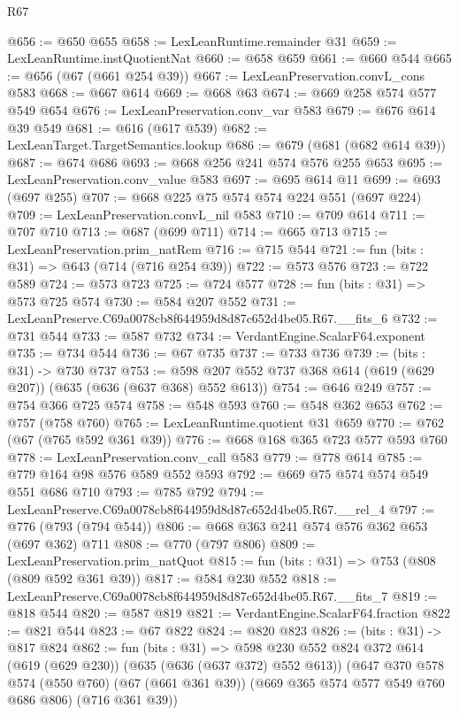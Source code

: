 \begin{lexlean}{R67}
\begin{coremodule}
@656 := @650 @655
@658 := LexLeanRuntime.remainder @31
@659 := LexLeanRuntime.instQuotientNat
@660 := @658 @659
@661 := @660 @544
@665 := @656 (@67 (@661 @254 @39))
@667 := LexLeanPreservation.convL_cons @583
@668 := @667 @614
@669 := @668 @63
@674 := @669 @258 @574 @577 @549 @654
@676 := LexLeanPreservation.conv_var @583
@679 := @676 @614 @39 @549
@681 := @616 (@617 @539)
@682 := LexLeanTarget.TargetSemantics.lookup
@686 := @679 (@681 (@682 @614 @39))
@687 := @674 @686
@693 := @668 @256 @241 @574 @576 @255 @653
@695 := LexLeanPreservation.conv_value @583
@697 := @695 @614 @11
@699 := @693 (@697 @255)
@707 := @668 @225 @75 @574 @574 @224 @551 (@697 @224)
@709 := LexLeanPreservation.convL_nil @583
@710 := @709 @614
@711 := @707 @710
@713 := @687 (@699 @711)
@714 := @665 @713
@715 := LexLeanPreservation.prim_natRem
@716 := @715 @544
@721 := fun (bits : @31) => @643 (@714 (@716 @254 @39))
@722 := @573 @576
@723 := @722 @589
@724 := @573 @723
@725 := @724 @577
@728 := fun (bits : @31) => @573 @725 @574
@730 := @584 @207 @552
@731 := LexLeanPreserve.C69a0078cb8f644959d8d87c652d4be05.R67.__fits_6
@732 := @731 @544
@733 := @587 @732
@734 := VerdantEngine.ScalarF64.exponent
@735 := @734 @544
@736 := @67 @735
@737 := @733 @736
@739 := (bits : @31) -> @730 @737
@753 := @598 @207 @552 @737 @368 @614 (@619 (@629 @207)) (@635 (@636 (@637 @368) @552 @613))
@754 := @646 @249
@757 := @754 @366 @725 @574
@758 := @548 @593
@760 := @548 @362 @653
@762 := @757 (@758 @760)
@765 := LexLeanRuntime.quotient @31 @659
@770 := @762 (@67 (@765 @592 @361 @39))
@776 := @668 @168 @365 @723 @577 @593 @760
@778 := LexLeanPreservation.conv_call @583
@779 := @778 @614
@785 := @779 @164 @98 @576 @589 @552 @593
@792 := @669 @75 @574 @574 @549 @551 @686 @710
@793 := @785 @792
@794 := LexLeanPreserve.C69a0078cb8f644959d8d87c652d4be05.R67.__rel_4
@797 := @776 (@793 (@794 @544))
@806 := @668 @363 @241 @574 @576 @362 @653 (@697 @362) @711
@808 := @770 (@797 @806)
@809 := LexLeanPreservation.prim_natQuot
@815 := fun (bits : @31) => @753 (@808 (@809 @592 @361 @39))
@817 := @584 @230 @552
@818 := LexLeanPreserve.C69a0078cb8f644959d8d87c652d4be05.R67.__fits_7
@819 := @818 @544
@820 := @587 @819
@821 := VerdantEngine.ScalarF64.fraction
@822 := @821 @544
@823 := @67 @822
@824 := @820 @823
@826 := (bits : @31) -> @817 @824
@862 := fun (bits : @31) =>
  @598
    @230
    @552
    @824
    @372
    @614
    (@619 (@629 @230))
    (@635 (@636 (@637 @372) @552 @613))
    (@647
      @370
      @578
      @574
      (@550 @760)
      (@67 (@661 @361 @39))
      (@669 @365 @574 @577 @549 @760 @686 @806)
      (@716 @361 @39))

\end{coremodule}
\end{lexlean}
